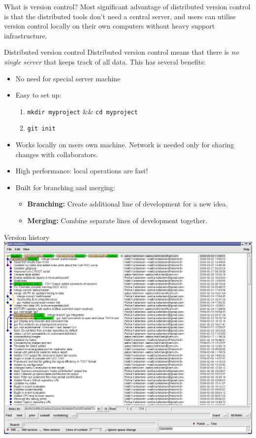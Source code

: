 \documentclass[final,hyperref={pdfpagelabels=false},notitlepage=true]{beamer}
\begin{document}
\begin{frame}{}
\begin{columns}[t]
\begin{column}{0.45\linewidth}
\begin{block}{\large What is version control?}
Most significant advantage of distributed version control is that the distributed
tools don't need a central server, and users can utilise
version control locally on their own computers without
heavy support infrastructure.

    \end{block}

    \begin{block}{\large Distributed version control}
      Distributed version control means that there is \emph{no single server}
      that keeps track of all data. This has several benefits:
      \begin{itemize}
        \item No need for special server machine
        \item Easy to set up:
          \begin{enumerate}
            \item {\tt mkdir myproject} \&\& {\tt cd myproject}
            \item {\tt git init}
          \end{enumerate}
        \item Works locally on users own machine. Network is needed
          only for sharing changes with collaborators.
        \item High performance: local operations are fast!
        \item Built for branching and merging:
          \begin{itemize}
            \item {\bf Branching:} Create additional line of
              development for a new idea.
            \item {\bf Merging:} Combine separate lines of development
              together.
          \end{itemize}
      \end{itemize}
    \end{block}

    \begin{block}{\large Version history}
      \includegraphics[scale=1.0]{images/gitk-history.png}
    \end{block}


\end{column}
\end{columns}
\end{frame}
\end{document}
